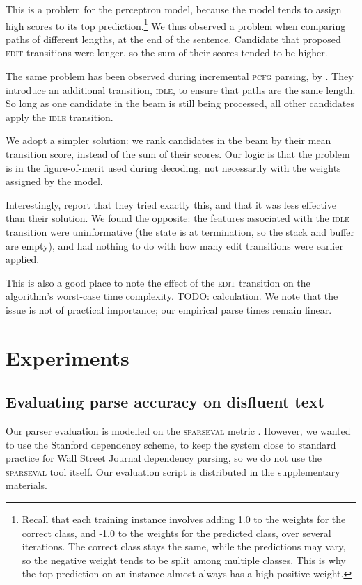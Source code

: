 \documentclass[11pt,letterpaper]{article}
\newcommand{\sparseval}{\textsc{sparseval}\xspace}
\begin{document}
This is a problem for the perceptron model, because the model tends to assign
high scores to its top prediction.\footnote{Recall that each training instance
involves adding 1.0 to the weights for the correct class, and -1.0 to the weights
for the predicted class, over several iterations. The correct class stays the
same, while the predictions may vary, so the negative weight tends to be split
among multiple classes. This is why the top prediction on an instance almost
always has a high positive weight.}
We thus observed a problem when comparing paths of different lengths, at the end
of the sentence. Candidate that proposed \textsc{edit} transitions were longer,
so the sum of their scores tended to be higher.

The same problem has been observed during incremental \textsc{pcfg} parsing,
by \citet{zhang:13}.  They introduce an additional transition, \textsc{idle},
to ensure that paths are the same length. So long as one candidate in the beam
is still being processed, all other candidates apply the \textsc{idle} transition.

We adopt a simpler solution: we rank candidates in the beam by their mean
transition score, instead of the sum of their scores. Our logic is that the
problem is in the figure-of-merit used during decoding, not necessarily with the
weights assigned by the model.

Interestingly, \citet{zhang:13} report that they tried exactly this, and that it
was less effective than their solution. We found the opposite: the features
associated with the \textsc{idle} transition were uninformative (the state is at
termination, so the stack and buffer are empty), and had nothing to do with how
many edit transitions were earlier applied.

This is also a good place to note the effect of the \textsc{edit} transition
on the algorithm's worst-case time complexity. TODO: calculation. We note that
the issue is not of practical importance; our empirical parse times remain linear.

\section{Experiments}

\subsection{Evaluating parse accuracy on disfluent text}

Our parser evaluation is modelled on the \sparseval metric \citep{sparseval}.
However, we wanted to use the Stanford dependency scheme, to keep the system
close to standard practice for Wall Street Journal dependency parsing, so we
do not use the \sparseval tool itself.  Our evaluation script is distributed
in the supplementary materials.
\end{document}
